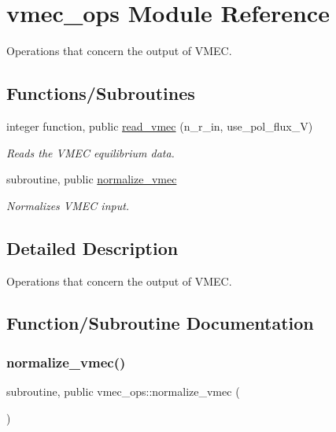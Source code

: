\hypertarget{namespacevmec__ops}{}\section{vmec\+\_\+ops Module Reference}
\label{namespacevmec__ops}


Operations that concern the output of V\+M\+EC.  


\subsection*{Functions/\+Subroutines}
\begin{DoxyCompactItemize}
\item 
integer function, public \hyperlink{namespacevmec__ops_a5afb9dedf9ef3dc2b4d93e20de2e22b8}{read\+\_\+vmec} (n\+\_\+r\+\_\+in, use\+\_\+pol\+\_\+flux\+\_\+V)
\begin{DoxyCompactList}\small\item\em Reads the V\+M\+EC equilibrium data. \end{DoxyCompactList}\item 
subroutine, public \hyperlink{namespacevmec__ops_a95f04a642fd732a538aef30052a12863}{normalize\+\_\+vmec}
\begin{DoxyCompactList}\small\item\em Normalizes V\+M\+EC input. \end{DoxyCompactList}\end{DoxyCompactItemize}


\subsection{Detailed Description}
Operations that concern the output of V\+M\+EC. 

\subsection{Function/\+Subroutine Documentation}
\mbox{\label{namespacevmec__ops_a95f04a642fd732a538aef30052a12863}} 
\subsubsection{\texorpdfstring{normalize\+\_\+vmec()}{normalize\_vmec()}}
{\footnotesize\ttfamily subroutine, public vmec\+\_\+ops\+::normalize\+\_\+vmec (\begin{DoxyParamCaption}{ }\end{DoxyParamCaption})}



